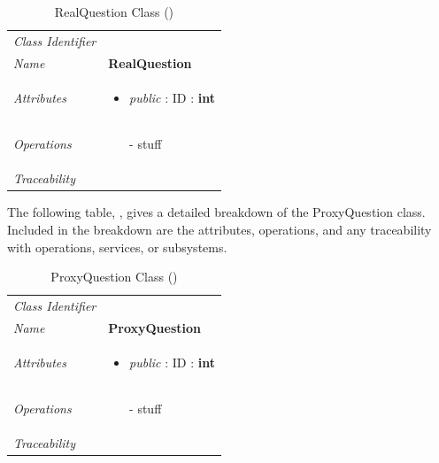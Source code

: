 \documentclass[12pt,letterpaper]{article}
\begin{document}
\begin{table}[H]
    \caption{RealQuestion Class ()} 
	\begin{tabu} to 
		\toprule
		Class Identifier &  \\
		Name & {\bf RealQuestion} \\
		Attributes & 
		\begin{minipage}[t]{\linewidth}
		    \begin{itemize}
		        \item \textit{public} : ID : \bf{int}
			\end{itemize}
	    \end{minipage} \\

		Operations &
		\begin{minipage}[t]{\linewidth}
			\begin{enumerate}
			    \item[-] stuff
	        \end{enumerate}
	    \end{minipage} \\
	    	Traceability & \\
		\toprule
	\end{tabu}
\end{table}

The following table, , gives a detailed breakdown of the ProxyQuestion class. Included in the breakdown are the attributes, operations, and any traceability with operations, services, or subsystems.

\begin{table}[H]
    \caption{ProxyQuestion Class ()} 
	\begin{tabu} to 
		\toprule
		Class Identifier &  \\
		Name & {\bf ProxyQuestion} \\
		Attributes & 
		\begin{minipage}[t]{\linewidth}
		    \begin{itemize}
		        \item \textit{public} : ID : \bf{int}
			\end{itemize}
	    \end{minipage} \\

		Operations &
		\begin{minipage}[t]{\linewidth}
			\begin{enumerate}
			    \item[-] stuff
	        \end{enumerate}
	    \end{minipage} \\
	    	Traceability & \\
		\toprule
	\end{tabu}
\end{table}
\end{document}
